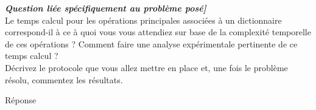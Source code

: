 \textit{\textbf{Question liée spécifiquement au problème posé]}} \\
Le temps calcul pour les opérations principales associées à un dictionnaire correspond-il à ce à quoi vous vous attendiez sur 
base de la complexité temporelle de ces opérations ? Comment faire une analyse expérimentale pertinente de ce temps calcul ? \\
Décrivez le protocole que vous allez mettre en place et, une fois le problème résolu, commentez les résultats.

Réponse
